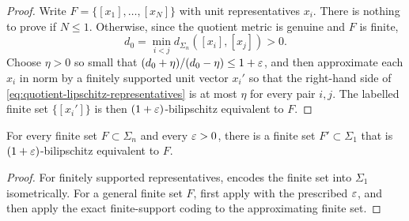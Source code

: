 \begin{proof}
Write $F=\{[x_1],\dots,[x_N]\}$ with unit representatives $x_i$.  There is
nothing to prove if $N\le1$.  Otherwise, since the quotient metric is genuine
and $F$ is finite,
\[
        d_0=\min_{i<j}d_{\Sigma_n}([x_i],[x_j])>0 .
\]
Choose $\eta>0$ so small that $(d_0+\eta)/(d_0-\eta)\le1+\varepsilon$, and then
approximate each $x_i$ in norm by a finitely supported unit vector $x_i'$ so
that the right-hand side of \eqref{eq:quotient-lipschitz-representatives} is at
most $\eta$ for every pair $i,j$.  The labelled finite set $\{[x_i']\}$ is then
$(1+\varepsilon)$-bilipschitz equivalent to $F$.
\end{proof}

\begin{lemma}\label{lem:sigma-n-to-sigma-1}
\leanok
{}
For every finite set $F\subset\Sigma_n$ and every $\varepsilon>0$, there is a finite
set $F'\subset\Sigma_1$ that is $(1+\varepsilon)$-bilipschitz equivalent to $F$.
\end{lemma}

\begin{proof}
For finitely supported representatives, 
encodes the finite set into $\Sigma_1$ isometrically.  For a general finite set
$F$, first apply  with the prescribed
$\varepsilon$, and then apply the exact finite-support coding to the approximating
finite set.
\end{proof}

